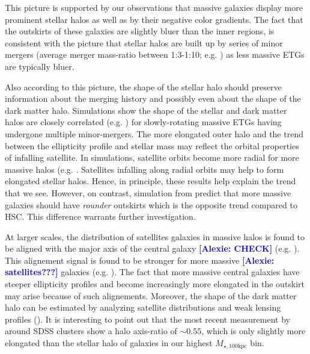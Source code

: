 \documentclass[a4paper,fleqn,usenatbib]{mnras}
\def\mtot{{$M_{\star,100\mathrm{kpc}}$}}
\newcommand{\alexie}[1]{\textcolor{blue}{\textbf{[Alexie: #1]}}}
\begin{document}
    This picture is supported by our observations that massive galaxies display more 
    prominent stellar halos as well as by their  negative color gradients. 
    The fact that the outskirts of these galaxies are slightly bluer than the inner
    regions, is consistent with the picture that stellar halos are built up by 
    series of minor mergers (average merger mass-ratio between 1:3-1:10; e.g. 
    \citealt{Huang2016}) as less massive ETGs are typically bluer. 

    Also according to this picture, the shape of the stellar halo should preserve information
    about the merging history and possibly even about the shape of the dark matter halo. 
    Simulations show the shape of the stellar and dark matter halos are closely correlated (e.g. \citealt{Wu2014}) for slowly-rotating massive ETGs having undergone multiple 
    minor-mergers. The more elongated outer halo and the trend between the ellipticity profile and 
    stellar mass may reflect the orbital properties of infalling satellite. 
    In simulations, satellite orbits become more radial for more massive halos (e.g. \citealt{Murante2007, Wetzel2011, Jiang2015}. Satellites infalling along radial orbits may  help to form elongated  stellar halos. Hence, in principle, these results help explain the trend that we see. However, on contrast, simulation from \citet{Wu2014} predict that more massive 
    galaxies should have \emph{rounder} outskirts which is the opposite trend compared to HSC. This difference warrants further investigation.
    
    At larger scales, the distribution of satellites galaxies in massive halos is found to  be aligned with the major axis of the central galaxy \alexie{CHECK} (e.g. \citealt{Brainerd2005, 
    Yang2006b, NiedersteOstholt2010, HuangMandelbaum2016}). This alignement signal is found to be stronger for more massive \alexie{satellites???} galaxies (e.g. \citealt{Hirata2007}).
    The fact that more massive central galaxies have steeper ellipticity profiles 
    and become increasingly more elongated in the outskirt may arise because of such alignements. Moreover, the shape of the dark matter halo can be estimated by analyzing satellite distributions and weak lensing profiles (\citealt{ClampittJain2016}). 
    It is interesting to point out that the most recent measurement by 
    \citet{Shin2017} around SDSS clusters show a halo axis-ratio of ${\sim}0.55$, 
    which is only slightly more elongated than the stellar halo of galaxies in our 
    highest \mtot{} bin.
    
\end{document}
